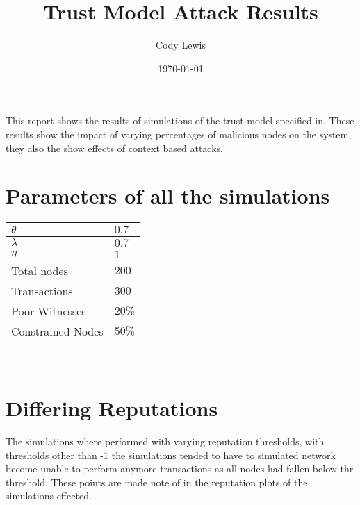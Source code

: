 \documentclass{article}
\title{Trust Model Attack Results}
\author{Cody Lewis}
\date{\today}
\begin{document}
  \maketitle
  \tableofcontents
  \newpage
  This report shows the results of simulations of the trust model specified
  in\cite{saied13}. These results show the impact of varying percentages of
  malicious nodes on the system, they also the show effects of context based
  attacks.
  \section{Parameters of all the simulations}
    \begin{tabularx}{\textwidth}{X X}
        \toprule
        $ \theta{} $ & $ 0.7 $ \\
        \midrule
        $ \lambda{} $ & $ 0.7 $ \\
        \midrule
        $ \eta{} $ & $ 1 $ \\
        \midrule
        Total nodes & $ 200 $ \\
        \midrule
        Transactions & $ 300 $ \\
        \midrule
        Poor Witnesses & $ 20\% $ \\
        \midrule
        Constrained Nodes & $ 50\% $ \\
        \bottomrule
    \end{tabularx} \\

    \section{Differing Reputations}
    The simulations where performed with varying reputation thresholds,
    with thresholds other than -1 the simulations tended to have to simulated
    network become unable to perform anymore transactions as all nodes had
    fallen below thr threshold. These points are made note of in the
    reputation plots of the simulations effected.\
\end{document}
